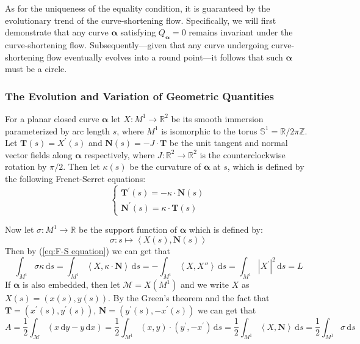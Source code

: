 As for the uniqueness of the equality condition, it is guaranteed by the evolutionary trend of the curve-shortening flow. Specifically, we will first demonstrate that any curve $\boldsymbol{\alpha}$ satisfying $Q_{\boldsymbol{\alpha}}=0$ remains invariant under the curve-shortening flow. Subsequently—given that any curve undergoing curve-shortening flow eventually evolves into a round point—it follows that such $\boldsymbol{\alpha}$ must be a circle.

\subsubsection{The Evolution and Variation of Geometric Quantities}

For a planar closed curve $\boldsymbol{\alpha}$ let $X:M^1\to\mathbb{R}^2$ be its smooth immersion parameterized by arc length $s$, where $M^1$ is isomorphic to the torus $\mathbb{S}^1=\mathbb{R}/2\pi\mathbb{Z}$. Let $\mathbf{T}(s)=X^\prime (s)$ and $\mathbf{N}(s)=-J\cdot\mathbf{T}$ be the unit tangent and normal vector fields along $\boldsymbol{\alpha}$ respectively, where $J:\mathbb{R}^2\to\mathbb{R}^2$ is the counterclockwise rotation by $\pi/2$. Then let $\kappa(s)$ be the curvature of $\boldsymbol{\alpha}$ at $s$, which is defined by the following Frenet-Serret equations:
\begin{equation}\label{eq:F-S equation}
    \begin{cases}
        \mathbf{T}^\prime(s)=-\kappa\cdot\mathbf{N}(s)\\
        \mathbf{N}^\prime(s)=\kappa\cdot\mathbf{T}(s)
    \end{cases}
\end{equation}

Now let $\sigma:M^1\to\mathbb{R}$ be the support function of $\boldsymbol{\alpha}$ which is defined by:
\begin{equation*}
    \sigma:s\mapsto\left<X(s),\mathbf{N}(s)\right>
\end{equation*}
Then by (\ref{eq:F-S equation}) we can get that
\begin{equation*}
    \int_{M^1}\sigma\kappa\,\mathrm{d}s=\int_{M^1}\left<X,\kappa\cdot\mathbf{N}\right>\,\mathrm{d}s=-\int_{M^1}\left<X,X{''}\right>\,\mathrm{d}s=\int_{M^1}{\left|X^{\prime}\right|}^2\,\mathrm{d}s=L
\end{equation*}
If $\boldsymbol{\alpha}$ is also embedded, then let $\mathcal{M}=X(M^1)$ and we write $X$ as $X(s)=(x(s),y(s))$. By the Green's theorem and the fact that $\mathbf{T}=(x^\prime(s),y^\prime(s))$, $\mathbf{N}=(y^\prime(s),-x^\prime(s))$ we can get that
\begin{equation*}
    A=\frac{1}{2}\int_{\mathcal{M}}(x\,\mathrm{d}y-y\,\mathrm{d}x)=\frac{1}{2}\int_{M^1}(x,y)\cdot(y^\prime,-x^\prime)\,\mathrm{d}s=\frac{1}{2}\int_{M^1}\left<X,\mathbf{N}\right>\,\mathrm{d}s=\frac{1}{2}\int_{M^1}\sigma\,\mathrm{d}s
\end{equation*}

